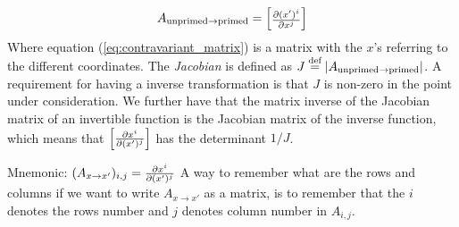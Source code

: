 \documentclass[a4paper, 12pt]{article}
\begin{document}
%
\begin{align}
 A_{\text{unprimed}\to \text{primed}}
 =
 \begin{bmatrix}
  \frac{\partial {(x')^i}}{\partial{x^j}}
 \end{bmatrix}
 \label{eq:contravariant_matrix}
\end{align}
%
Where equation (\ref{eq:contravariant_matrix}) is a matrix with the $x$'s 
referring to the different coordinates. The \emph{Jacobian} is 
defined as $J\overset{\text{def}}{=}|A_{\text{unprimed}\to \text{primed}}|$. A requirement for 
having a inverse transformation is that $J$ is non-zero in the point under 
consideration. We further have that the matrix inverse of the Jacobian matrix 
of an invertible function is the Jacobian matrix of the inverse function, which 
means that
%
$\begin{bmatrix}
 \frac{\partial {x^i}}{\partial{(x')^j}}
\end{bmatrix}$
has the determinant $1/J$.

\vspace{0.5cm}
\begin{greenbox}{Mnemonic: $(A_{x \to x'})_{i,j} = \frac{\partial {x^i}}{\partial{(x')^j}}$}
 A way to remember what are the rows and columns if we want to write $A_{x \to 
 x'}$ as a matrix, is to remember that the $i$ denotes the rows number and 
 $j$ denotes column number in $A_{i,j}$.
\end{greenbox}
\end{document}
